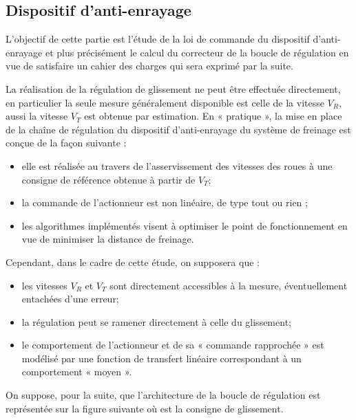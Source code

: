 \documentclass[10pt,fleqn]{article} %
\begin{document}

\vspace{5cm}
\pagestyle{fancy}
\thispagestyle{plain}

\def\columnseprulecolor{\color{ocre}}
\setlength{\columnseprule}{0.4pt} 

\def\pathfig{images}

\begin{multicols}{2}

\subsection*{Dispositif d'anti-enrayage}
L’objectif de cette partie est l’étude de la loi de commande du dispositif d’anti-enrayage
et plus précisément le calcul du correcteur de la boucle de régulation en
vue de satisfaire un cahier des charges qui sera exprimé par la suite.

La réalisation de la régulation de glissement ne peut être effectuée directement,
en particulier la seule mesure généralement disponible est celle de la vitesse $V_R$, aussi la vitesse $V_T$ est obtenue par estimation. En « pratique », la mise en
place de la chaîne de régulation du dispositif d’anti-enrayage du système de freinage
est conçue de la façon suivante :
\begin{itemize}
\item elle est réalisée au travers de l’asservissement des vitesses des roues à une
consigne de référence obtenue à partir de $V_T$;
\item la commande de l’actionneur est non linéaire, de type tout ou rien ;
\item les algorithmes implémentés visent à optimiser le point de fonctionnement
en vue de minimiser la distance de freinage.
\end{itemize}
Cependant, dans le cadre de cette étude, on supposera que :
\begin{itemize}
\item les vitesses $V_R$ et $V_T$ sont directement accessibles à la mesure, éventuellement
entachées d’une erreur;
\item la régulation peut se ramener directement à celle du glissement;
\item  le comportement de l’actionneur et de sa « commande rapprochée » est modélisé
par une fonction de transfert linéaire correspondant à un comportement
« moyen ».
\end{itemize}
On suppose, pour la suite, que l’architecture de la boucle de régulation est représentée sur la figure suivante où est la consigne de glissement.


\end{multicols}
\end{document}
